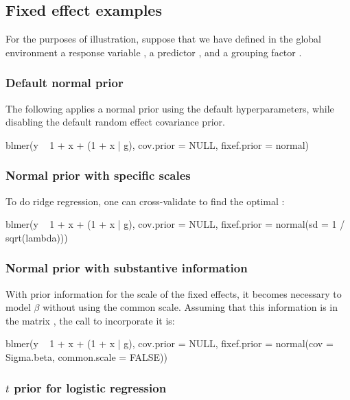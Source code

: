 \documentclass[article,shortnames]{jss}
\begin{document}
\subsection{Fixed effect examples}

For the purposes of illustration, suppose that we have defined in the
global environment a response variable , a predictor
, and a grouping factor .

\subsubsection*{Default normal prior}

The following applies a normal prior using the default
hyperparameters, while disabling the default random effect covariance prior.

\begin{Code}
blmer(y ~ 1 + x + (1 + x | g), cov.prior = NULL,
      fixef.prior = normal)
\end{Code}

\subsubsection*{Normal prior with specific scales}

To do ridge regression, one can cross-validate to find the optimal
:

\begin{Code}
blmer(y ~ 1 + x + (1 + x | g), cov.prior = NULL,
      fixef.prior = normal(sd = 1 / sqrt(lambda)))
\end{Code}

\subsubsection*{Normal prior with substantive information}

With prior information for the scale of the fixed effects, it becomes
necessary to model $\beta$ without using the common scale. Assuming
that this information is in the matrix , the
 call to incorporate it is:

\begin{Code}
blmer(y ~ 1 + x + (1 + x | g), cov.prior = NULL,
      fixef.prior = normal(cov = Sigma.beta, common.scale = FALSE))
\end{Code}

\subsubsection*{$t$ prior for
  logistic regression}
\end{document}
